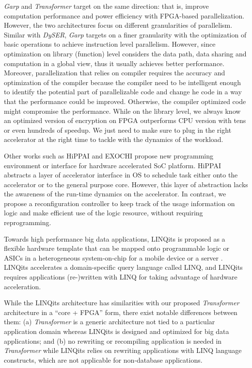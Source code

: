 {\em Garp} \cite{Garp:1997,Garp:2000} and {\em Transformer} target on the same direction: that is, improve computation performance and power efficiency with FPGA-based parallelization. However, the two architectures focus on different granularities of parallelism. Similar with {\em DySER}, {\em Garp} targets on a finer granularity with the optimization of basic operations to achieve instruction level parallelism. However, since optimization on library (function) level considers the data path, data sharing and computation in a global view, thus it usually achieves better performance. Moreover, parallelization that relies on compiler requires the accuracy and optimization of the compiler because the compiler need to be intelligent enough to identify the potential part of parallelizable code and change he code in a way that the performance could be improved. Otherwise, the compiler optimized code might compromise the performance. While on the library level, we always know an optimized version of encryption on FPGA outperforms CPU version with tens or even hundreds of speedup. We just need to make sure to plug in the right accelerator at the right time to tackle with the dynamics of the workload.

Other works such as HiPPAI \cite{Stillwell:2009if} and EXOCHI
\cite{Wang:2007bc} propose new programming environment or interface
for hardware accelerated SoC platform. HiPPAI abstracts a layer of
accelerator interface in OS to schedule task either onto the
accelerator or to the general purpose core. However, this layer of
abstraction lacks the awareness of the run-time dynamics on the
accelerator. In contrast, we propose a reconfiguration controller to
keep track of the usage information on logic and make 
efficient use of the logic resource, without requiring reprogramming. 

Towards high performance big data applications, LINQits is proposed as
a flexible hardware template that can be mapped onto programmable
logic or ASICs in a heterogeneous system-on-chip for a mobile device
or a server \cite{Chung:2013:LBD:2485922.2485945}. LINQits accelerates a domain-specific query
language called LINQ, and LINQits requires applications (re-)written with
LINQ for taking advantage of hardware acceleration. 

While the LINQits architecture has similarities with our proposed {\em
  Transformer} architecture in a ``core + FPGA'' form, there exist
notable differences between them: (a) {\em Transformer} is a
generic architecture not tied to a particular application domain
whereas LINQits is designed and optimized for big data applications; and (b) no rewriting or recompiling application is needed in {\em Transformer} while
LINQits relies on rewriting applications with LINQ language
constructs, which are not applicable for non-database applications.

